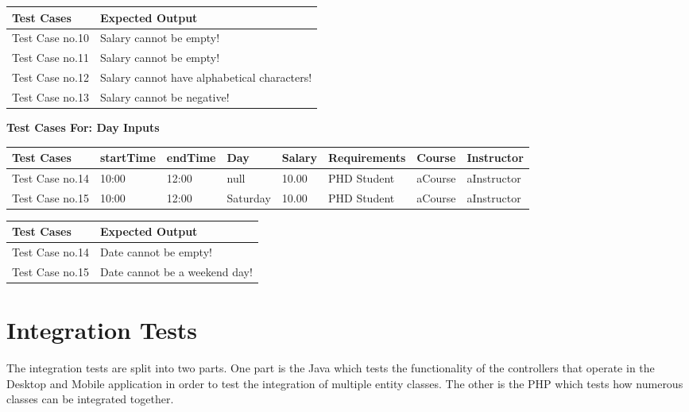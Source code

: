 \documentclass[12pt]{report}
\begin{document}
	\begin{flushleft}
		\begin{tabular}{ | l | l | }
			\hline
			Test Cases & Expected Output \\ \hline
			Test Case no.10 & Salary cannot be empty! \\ \hline
			Test Case no.11 & Salary cannot be empty! \\ \hline
			Test Case no.12 & Salary cannot have alphabetical characters! \\ \hline
			Test Case no.13 & Salary cannot be negative! \\ \hline
		\end{tabular}
	\end{flushleft}

	\textbf{Test Cases For: Day Inputs}
	\begin{flushleft}
		\begin{tabular}{ | l | l | l | l | l | l | l | l | }
			\hline
			Test Cases & startTime & endTime & Day & Salary & Requirements & Course & Instructor \\ \hline
			Test Case no.14 & 10:00 & 12:00 & null & 10.00 & PHD Student & aCourse & aInstructor \\ \hline
			Test Case no.15 & 10:00 & 12:00 & Saturday & 10.00 & PHD Student & aCourse & aInstructor \\ \hline
		\end{tabular}
	\end{flushleft}
	
	\begin{flushleft}
		\begin{tabular}{ | l | l | }
			\hline
			Test Cases & Expected Output \\ \hline
			Test Case no.14 & Date cannot be empty! \\ \hline
			Test Case no.15 & Date cannot be a weekend day! \\ \hline
		\end{tabular}
	\end{flushleft}
\part{Integration Tests}
The integration tests are split into two parts. One part is the Java which tests the functionality of the controllers that operate in the Desktop and Mobile application in order to test the integration of multiple entity classes. The other is the PHP which tests how numerous classes can be integrated together. 
\end{document}

